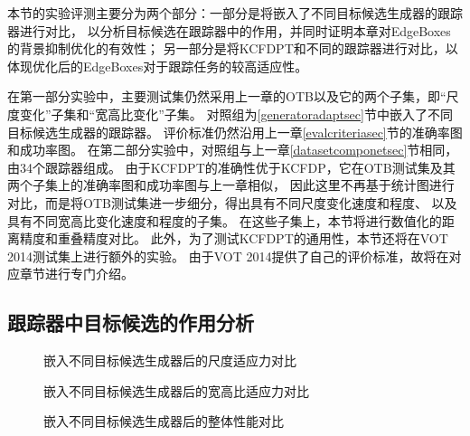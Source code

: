 本节的实验评测主要分为两个部分：一部分是将嵌入了不同目标候选生成器的跟踪器进行对比，
以分析目标候选在跟踪器中的作用，并同时证明本章对EdgeBoxes的背景抑制优化的有效性；
另一部分是将KCFDPT和不同的跟踪器进行对比，以体现优化后的EdgeBoxes对于跟踪任务的较高适应性。

在第一部分实验中，主要测试集仍然采用上一章的OTB以及它的两个子集，即``尺度变化''子集和``宽高比变化''子集。
对照组为\ref{generatoradaptsec}节中嵌入了不同目标候选生成器的跟踪器。
评价标准仍然沿用上一章\ref{evalcriteriasec}节的准确率图和成功率图。
在第二部分实验中，对照组与上一章\ref{datasetcomponetsec}节相同，由34个跟踪器组成。
由于KCFDPT的准确性优于KCFDP，它在OTB测试集及其两个子集上的准确率图和成功率图与上一章相似，
因此这里不再基于统计图进行对比，而是将OTB测试集进一步细分，得出具有不同尺度变化速度和程度、
以及具有不同宽高比变化速度和程度的子集。
在这些子集上，本节将进行数值化的距离精度和重叠精度对比。
此外，为了测试KCFDPT的通用性，本节还将在VOT 2014测试集上进行额外的实验。
由于VOT 2014提供了自己的评价标准，故将在对应章节进行专门介绍。

\subsection{跟踪器中目标候选的作用分析}
\label{dpeffectsec}
\begin{figure}[htb]
  \centering
  \hspace{-2.5cm}
  \newline
  \caption{嵌入不同目标候选生成器后的尺度适应力对比}
  \label{resultdpscale}
\end{figure}

\begin{figure}[htb]
  \centering
  \hspace{-2.5cm}
  \newline
  \caption{嵌入不同目标候选生成器后的宽高比适应力对比}
  \label{resultdpas}
\end{figure}

\begin{figure}[htb]
  \centering
  \hspace{-2.6cm}
  \newline
  \caption{嵌入不同目标候选生成器后的整体性能对比}
  \label{resultdpall}
\end{figure}

